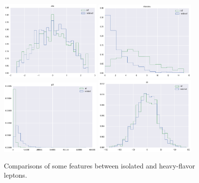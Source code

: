 \begin{figure}[htbp]
    \centering
    \includegraphics[width=0.45\textwidth]{Images/RNN/lep_eta.png}
    \includegraphics[width=0.45\textwidth]{Images/RNN/lep_ntracks.png}
    \includegraphics[width=0.45\textwidth]{Images/RNN/lep_pT.png}
    \includegraphics[width=0.45\textwidth]{Images/RNN/lep_z0.png}
    \caption{Comparisons of some features between isolated and heavy-flavor leptons.}
    \label{fig:lep_features}
\end{figure}

